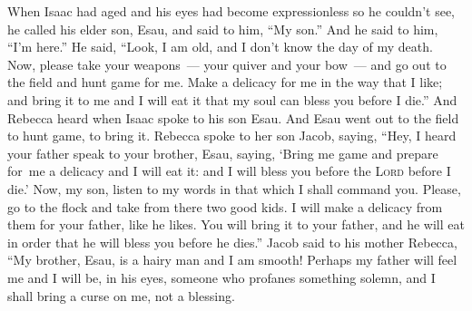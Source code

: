 
\begin{inparaenum}
   When Isaac had aged and his eyes had become expressionless so he couldn't see, he called his elder son, Esau, and said to him, ``My son.'' And he said to him, ``I'm here.''%
   He said, ``Look, I am old, and I don't know the day of my death.%
   Now, please take your weapons~--- your quiver and your bow~--- and go out to the field and hunt game for me.%
   Make a delicacy for me in the way that I like; and bring it to me and I will eat it that my soul can bless you before I die.''%
   And Rebecca heard when Isaac spoke to his son Esau. And Esau went out to the field to hunt game, to bring it.%
   Rebecca spoke to her son Jacob, saying, ``Hey, I heard your father speak to your brother, Esau, saying,%
   `Bring me game and prepare for\understood\ me a delicacy and I will eat it: and I will bless you before the \textsc{Lord} before I die.'%
   Now, my son, listen to my words in that which I shall command you.%
   Please, go to the flock and take from there two good kids. I will make a delicacy from them for your father, like he likes.%
   You will bring it to your father, and he will eat in order%
  that he will bless you before he dies.''%
   Jacob said to his mother Rebecca, ``My brother, Esau, is a hairy man and I am smooth!%
   Perhaps my father will feel me and I will be, in his eyes, someone who profanes something solemn,%
  and I shall bring a curse on me, not a blessing.%
  

\end{inparaenum}
